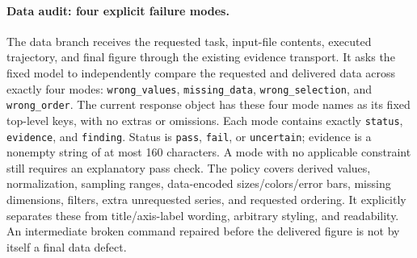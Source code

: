 \documentclass[11pt]{article}
\begin{document}
\paragraph{Data audit: four explicit failure modes.}
The data branch receives the requested task, input-file contents,
executed trajectory, and final figure through the existing evidence
transport. It asks the fixed model to independently compare the
requested and delivered data across exactly four modes:
\texttt{wrong\_values}, \texttt{missing\_data},
\texttt{wrong\_selection}, and \texttt{wrong\_order}.
The current response object has these four mode names as its fixed
top-level keys, with no extras or omissions. Each mode contains exactly
\texttt{status}, \texttt{evidence}, and \texttt{finding}.
Status is \texttt{pass}, \texttt{fail}, or \texttt{uncertain}; evidence
is a nonempty string of at most 160 characters. A mode with no applicable
constraint still requires an explanatory pass check.
The policy covers derived values, normalization, sampling ranges,
data-encoded sizes/colors/error bars, missing dimensions, filters,
extra unrequested series, and requested ordering. It explicitly separates
these from title/axis-label wording, arbitrary styling, and readability.
An intermediate broken command repaired before the delivered figure is
not by itself a final data defect.
\end{document}
